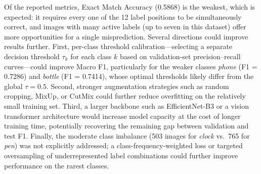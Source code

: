 \documentclass[10pt]{article}
\begin{document}
Of the reported metrics, Exact Match Accuracy (0.5868) is the weakest, which is expected: it
requires every one of the 12 label positions to be simultaneously correct, and images with many
active labels (up to seven in this dataset) offer more opportunities for a single misprediction.
Several directions could improve results further.  First, per-class threshold calibration---selecting
a separate decision threshold $\tau_k$ for each class $k$ based on validation-set
precision--recall curves---could improve Macro F1, particularly for the weaker classes
\textit{phone} (F1 = 0.7286) and \textit{bottle} (F1 = 0.7414), whose optimal thresholds likely
differ from the global $\tau = 0.5$.  Second, stronger augmentation strategies such as random
cropping, MixUp, or CutMix could further reduce overfitting on the relatively small training set.
Third, a larger backbone such as EfficientNet-B3 or a vision transformer architecture would
increase model capacity at the cost of longer training time, potentially recovering the remaining
gap between validation and test F1.  Finally, the moderate class imbalance (503 images for
\textit{clock} vs.\ 765 for \textit{pen}) was not explicitly addressed; a class-frequency-weighted
loss or targeted oversampling of underrepresented label combinations could further improve
performance on the rarest classes.




\end{document}

